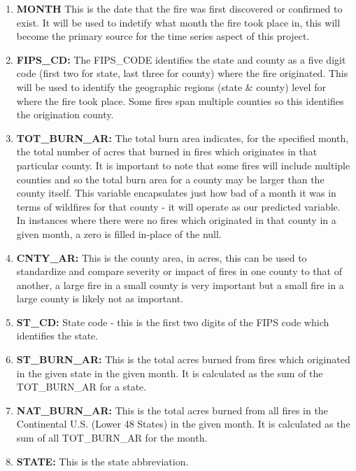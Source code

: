 \documentclass[12pt]{article}
\begin{document}
\begin{enumerate} \item \textbf{MONTH} This is the date that the fire was first discovered or confirmed to exist. It will be used to indetify what month the fire took place in, this will become the primary source for the time series aspect of this project.

\item \textbf{FIPS\_CD:} The FIPS\_CODE identifies the state and county as a five digit code (first two for state, last three for county) where the fire originated. This will be used to identify the geographic regions (state \& county) level for where the fire took place. Some fires span multiple counties so this identifies the origination county. 

\item \textbf{TOT\_BURN\_AR:} The total burn area indicates, for the specified month, the total number of acres that burned in fires which originates in that particular county. It is important to note that some fires will include multiple counties and so the total burn area for a county may be larger than the county itself. This variable encapsulates just how bad of a month it was in terms of wildfires for that county - it will operate as our predicted variable. In instances where there were no fires which originated in that county in a given month, a zero is filled in-place of the null. 

\item \textbf{CNTY\_AR:} This is the county area, in acres, this can be used to standardize and compare severity or impact of fires in one county to that of another, a large fire in a small county is very important but a small fire in a large county is likely not as important. 

\item \textbf{ST\_CD:} State code - this is the first two digits of the FIPS code which identifies the state. 

\item \textbf{ST\_BURN\_AR:} This is the total acres burned from fires which originated in the given state in the given month. It is calculated as the sum of the TOT\_BURN\_AR for a state. 

\item \textbf{NAT\_BURN\_AR:} This is the total acres burned from all fires in the Continental U.S. (Lower 48 States) in the given month. It is calculated as the sum of all TOT\_BURN\_AR for the month. 

\item \textbf{STATE:} This is the state abbreviation. 


\end{enumerate}
\end{document}
